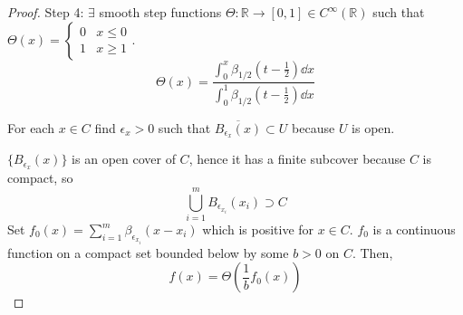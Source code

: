 \documentclass[a4paper]{article}
\numberwithin{equation}{section}
\newcommand{\R}{\mathbb{R}}
\begin{document}
\begin{theorem}
\begin{lemma}
\begin{proof}
            Step 4: $\exists$ smooth step functions $\Theta:\R\to[0,1]\in C^\infty(\R)$ such that $\Theta(x)=\begin{cases}
                0 & x\leq0\\
                1 & x\geq1
            \end{cases}$.
            \begin{equation}
                \Theta(x)=\frac{\int_0^x\beta_{1/2}(t-\frac{1}{2})\dd x}{\int_0^1\beta_{1/2}(t-\frac{1}{2})\dd x}
            \end{equation}

            For each $x\in C$ find $\epsilon_x>0$ such that $\overline{B_{\epsilon_x}(x)}\subset U$ because $U$ is open. 
            
            $\{B_{\epsilon_x}(x)\}$ is an open cover of $C$, hence it has a finite subcover because $C$ is compact, so 
            \begin{equation}
                \bigcup_{i=1}^m B_{\epsilon_{x_i}}(x_i)\supset C
            \end{equation}
            Set $f_0(x)=\sum_{i=1}^m\beta_{\epsilon_{x_i}}(x-x_i)$ which is positive for $x\in C$. $f_0$ is a continuous function on a compact set bounded below by some $b>0$ on $C$. Then,
            \begin{equation}
                f(x)=\Theta(\frac{1}{b}f_0(x))
            \end{equation}
        \end{proof}
    \end{lemma}
\end{theorem}
\end{document}
